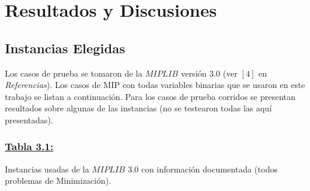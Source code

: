 \section{Resultados y Discusiones}

\subsection{Instancias Elegidas}
Los casos de prueba se tomaron de la $MIPLIB$ versión 3.0 (ver $[4]$ en \emph{Referencias}). Los casos de MIP con todas variables binarias que se usaron en este trabajo se listan a continuación. Para los casos de prueba corridos se presentan resultados sobre algunas de las instancias (no se testearon todas las aquí presentadas).\\

\subsubsection*{\underline{Tabla 3.1:}}
\noindent Instancias usadas de la $MIPLIB$ 3.0 con información documentada (todos problemas de Minimización).


